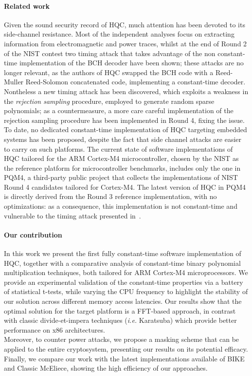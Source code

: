 \documentclass[11pt,a4paper,twocolumn]{article}
\theoremstyle{definition}
\begin{document}
\paragraph{Related work} Given the sound security record of HQC, much attention has been devoted to its side-channel
resistance. Most of the independent analyses focus on extracting information from electromagnetic and power traces,
whilst at the end of Round 2 of the NIST contest two timing attack that takes advantage of the non constant-time implementation of the BCH decoder have been shown; these attacks are no longer relevant,
as the authors of HQC swapped the BCH code with a Reed-Muller Reed-Solomon concatenated code, implementing a constant-time decoder.
Nontheless a new timing attack has been discovered, which exploits a weakness in the
\emph{rejection sampling} procedure, employed to generate random sparse polynomials; as a countermeasure, a more care careful implementation
of the rejection sampling procedure has been implemented in Round 4, fixing the issue.\\
To date, no dedicated constant-time implementation of HQC targeting embedded systems has been proposed, despite the fact that side channel attacks
are easier to carry on such platforms. The current state of software implementations of HQC tailored for the ARM Cortex-M4 microcontroller, chosen
by the NIST as the reference platform for microcontroller benchmarks, includes only the one in PQM4, a third-party
public project that collects the implementations of NIST Round 4 candidates tailored for Cortex-M4. The latest version of HQC in PQM4 is directly
derived from the Round 3 reference implementation, with no optimizations: as a consequence, this implementation is not constant-time and 
vulnerable to the timing attack presented in~\cite{DBLP:journals/tches/GuoHJLNS22}.

\paragraph{Our contribution} In this work we present the first fully constant-time
software implementation of HQC, together with a comparative analysis of constant-time
binary polynomial multiplication techniques, both tailored for ARM Cortex-M4 microprocessors.
We provide an experimental validation of the constant-time properties via a battery of statistical
t-tests, while varying the CPU frequency to highlight the stability of our solution across
different memory access latencies. Our results show that the optimal solution for the target 
platform is a FFT-based approach, in contrast with classic divide-et-impera techniques
(\emph{i.e.} Karatsuba) which provide better performance on x86 architectures.\\
Moreover, to counter power attacks, we propose a masking scheme that can be applied to the
entire cryptosystem, presenting our results on its potential efficacy.
Finally, we compare our work with the latest implementations available of
BIKE and Classic McEliece, showing the high efficiency of our approaches.
\end{document}
